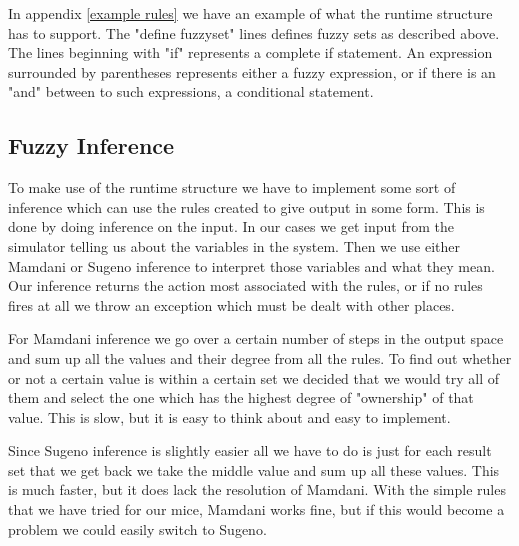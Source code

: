 In appendix \ref{example rules} we have an example of what the runtime structure
has to support. The "define fuzzyset" lines defines fuzzy sets as described above.
The lines beginning with "if" represents a complete if statement. An expression
surrounded by parentheses represents either a fuzzy expression, or if there is an
"and" between to such expressions, a conditional statement.

\subsection{Fuzzy Inference}\label{fuzzy inference}
To make use of the runtime structure we have to implement some sort of inference
which can use the rules created to give output in some form. This is done by
doing inference on the input. In our cases we get input from the simulator
telling us about the variables in the system. Then we use either Mamdani or
Sugeno inference to interpret those variables and what they mean. Our inference
returns the action most associated with the rules, or if no rules fires at all
we throw an exception which must be dealt with other places.

For Mamdani inference we go over a certain number of steps in the output space
and sum up all the values and their degree from all the rules. To find out
whether or not a certain value is within a certain set we decided that we would
try all of them and select the one which has the highest degree of "ownership"
of that value. This is slow, but it is easy to think about and easy to implement.

Since Sugeno inference is slightly easier all we have to do is just for each result
set that we get back we take the middle value and sum up all these values. This
is much faster, but it does lack the resolution of Mamdani. With the simple rules
that we have tried for our mice, Mamdani works fine, but if this would become a
problem we could easily switch to Sugeno.
